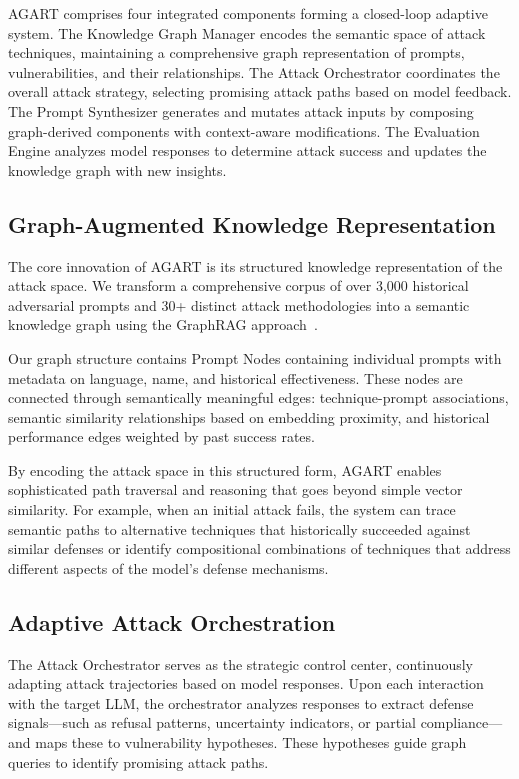 AGART comprises four integrated components forming a closed-loop adaptive system. The Knowledge Graph Manager encodes the semantic space of attack techniques, maintaining a comprehensive graph representation of prompts, vulnerabilities, and their relationships. The Attack Orchestrator coordinates the overall attack strategy, selecting promising attack paths based on model feedback. The Prompt Synthesizer generates and mutates attack inputs by composing graph-derived components with context-aware modifications. The Evaluation Engine analyzes model responses to determine attack success and updates the knowledge graph with new insights.

\subsection{Graph-Augmented Knowledge Representation}
The core innovation of AGART is its structured knowledge representation of the attack space. We transform a comprehensive corpus of over 3,000 historical adversarial prompts and 30+ distinct attack methodologies into a semantic knowledge graph using the GraphRAG approach~\cite{GraphRAG}. 

Our graph structure contains Prompt Nodes containing individual prompts with metadata on language, name, and historical effectiveness. These nodes are connected through semantically meaningful edges: technique-prompt associations, semantic similarity relationships based on embedding proximity, and historical performance edges weighted by past success rates.

By encoding the attack space in this structured form, AGART enables sophisticated path traversal and reasoning that goes beyond simple vector similarity. For example, when an initial attack fails, the system can trace semantic paths to alternative techniques that historically succeeded against similar defenses or identify compositional combinations of techniques that address different aspects of the model's defense mechanisms.

\subsection{Adaptive Attack Orchestration}
The Attack Orchestrator serves as the strategic control center, continuously adapting attack trajectories based on model responses. Upon each interaction with the target LLM, the orchestrator analyzes responses to extract defense signals—such as refusal patterns, uncertainty indicators, or partial compliance—and maps these to vulnerability hypotheses. These hypotheses guide graph queries to identify promising attack paths.

